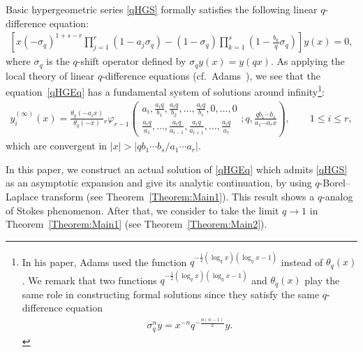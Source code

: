 Basic hypergeometric series \eqref{qHGS} formally satisfies the following linear $q$-difference equation:
\begin{gather}\label{qHGEq}
\left[x(-\sigma_q)^{1+s-r}\prod_{j=1}^r(1-a_j\sigma_q)-(1-\sigma_q)\prod_{k=1}^s\left(1-\frac{b_k}{q}\sigma_q\right)\right]y(x)=0,
\end{gather}
where $\sigma_q$ is the $q$-shift operator defined by $\sigma_qy(x)=y(qx)$. As applying the local theory of linear $q$-difference equations (cf.\ Adams~\cite{Adams1929}), we see that the equation~\eqref{qHGEq} has a fundamental system of solutions around infinity\footnote{In his paper, Adams used the function $q^{-\frac{1}{2}(\log_q x)(\log_q x-1)}$ instead of $\theta_q(x)$. We remark that two functions $q^{-\frac{1}{2}(\log_q x)(\log_q x-1)}$ and $\theta_q(x)$ play the same role in constructing formal solutions since they satisfy the same $q$-difference equation
\begin{gather*}
\sigma_q^n y=x^{-n}q^{-\frac{n(n-1)}{2}}y.
\end{gather*}}:
\begin{gather}\label{qHGEq_Sol}
y_i^{(\infty)}(x)=\frac{\theta_q(-a_ix)}{\theta_q(-x)}{}_{r}\varphi_{r-1}
\left(\begin{matrix}
a_i,\frac{a_iq}{b_1},\frac{a_iq}{b_2},\ldots,\frac{a_iq}{b_s},0,\ldots,0\\
\frac{a_iq}{a_1},\ldots,\frac{a_iq}{a_{i-1}},\frac{a_iq}{a_{i+1}},\ldots,\frac{a_iq}{a_r}
\end{matrix};q,\frac{qb_1\cdots b_s}{a_1\cdots a_rx}\right),\qquad\!\! 1\le i\le r,\!\!\!
\end{gather}
which are convergent in $\vert x\vert>\vert qb_1\cdots b_s/a_1\cdots a_r\vert$.

In this paper, we construct an actual solution of \eqref{qHGEq} which admits \eqref{qHGS} as an asymptotic expansion and give its analytic continuation, by using $q$-Borel--Laplace transform (see Theorem~\ref{Theorem:Main1}). This result shows a $q$-analog of Stokes phenomenon. After that, we consider to take the limit $q\to1$ in Theorem~\ref{Theorem:Main1} (see Theorem~\ref{Theorem:Main2}).

